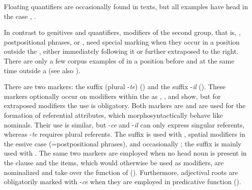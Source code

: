 Floating quantifiers are occasionally found in texts, but all examples have head  in the  case , . 

In contrast to genitives and quantifiers, modifiers of the second group, that is, , postpositional phrases, or , need special marking when they occur in a position outside the , either immediately following it or further extraposed to the right. There are only a few corpus examples of  in a position before and at the same time outside a   (see also ).

There are two markers: the suffix  (plural -\textit{te}) () and the suffix -\textit{il} (). These markers optionally occur on modifiers within the  as , ,  and  show, but for extraposed modifiers the use is obligatory. Both markers are  and are used for the formation of referential attributes, which morphosyntactically behave like nominals. Their use is similar, but -\textit{ce} and -\textit{il} can only express singular referents, whereas -\textit{te} requires plural referents. The suffix  is used with  , spatial modifiers in the essive case (=postpositional phrases), and occasionally ; the suffix  is mainly used with  . The same two markers are employed when no head noun is present in the clause and the items, which would otherwise be used as modifiers, are nominalized and take over the function of  (). Furthermore, adjectival roots are obligatorily marked with -\textit{ce} when they are employed in predicative function ().

